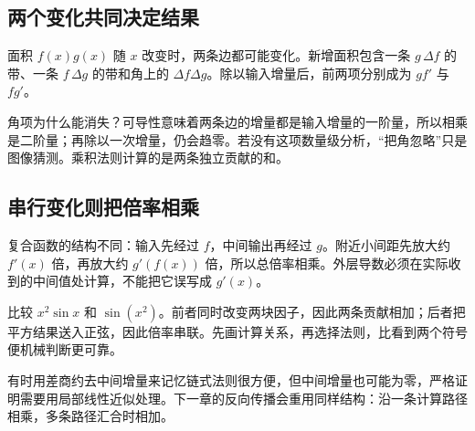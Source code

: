 \subsection*{两个变化共同决定结果}
面积 $f(x)g(x)$ 随 $x$ 改变时，两条边都可能变化。新增面积包含一条 $g\,\Delta f$ 的带、一条 $f\,\Delta g$ 的带和角上的 $\Delta f\Delta g$。除以输入增量后，前两项分别成为 $gf'$ 与 $fg'$。

角项为什么能消失？可导性意味着两条边的增量都是输入增量的一阶量，所以相乘是二阶量；再除以一次增量，仍会趋零。若没有这项数量级分析，“把角忽略”只是图像猜测。乘积法则计算的是两条独立贡献的和。

\subsection*{串行变化则把倍率相乘}
复合函数的结构不同：输入先经过 $f$，中间输出再经过 $g$。附近小间距先放大约 $f'(x)$ 倍，再放大约 $g'(f(x))$ 倍，所以总倍率相乘。外层导数必须在实际收到的中间值处计算，不能把它误写成 $g'(x)$。

比较 $x^2\sin x$ 和 $\sin(x^2)$。前者同时改变两块因子，因此两条贡献相加；后者把平方结果送入正弦，因此倍率串联。先画计算关系，再选择法则，比看到两个符号便机械判断更可靠。

有时用差商约去中间增量来记忆链式法则很方便，但中间增量也可能为零，严格证明需要用局部线性近似处理。下一章的反向传播会重用同样结构：沿一条计算路径相乘，多条路径汇合时相加。

